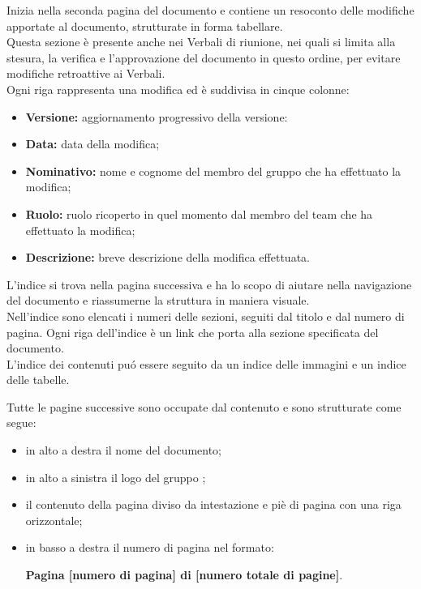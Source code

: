         Inizia nella seconda pagina del documento e contiene un resoconto delle modifiche apportate al documento, strutturate in forma tabellare.\\
        Questa sezione è presente anche nei Verbali di riunione, nei quali si limita alla stesura, la verifica e l'approvazione del documento in questo ordine, per evitare modifiche retroattive ai Verbali.\\
        Ogni riga rappresenta una modifica ed è suddivisa in cinque colonne:
        \begin{itemize}
          \item \textbf{Versione:} aggiornamento progressivo della versione:
          \item \textbf{Data:} data della modifica;
          \item \textbf{Nominativo:} nome e cognome del membro del gruppo che ha effettuato la modifica;
          \item \textbf{Ruolo:} ruolo ricoperto in quel momento dal membro del team che ha effettuato la modifica;
          \item \textbf{Descrizione:} breve descrizione della modifica effettuata.
        \end{itemize}

        L'indice si trova nella pagina successiva e ha lo scopo di aiutare nella navigazione del documento e riassumerne la struttura in maniera visuale.\\
        Nell'indice sono elencati i numeri delle sezioni, seguiti dal titolo e dal numero di pagina. Ogni riga dell'indice è un link che porta alla sezione specificata del documento.\\
        L'indice dei contenuti puó essere seguito da un indice delle immagini e un indice delle tabelle.

        Tutte le pagine successive sono occupate dal contenuto e sono strutturate come segue:
        \begin{itemize}
          \item in alto a destra il nome del documento;
          \item in alto a sinistra il logo del gruppo \Gruppo{};
          \item il contenuto della pagina diviso da intestazione e piè di pagina con una riga orizzontale;
          \item in basso a destra il numero di pagina nel formato:
          \begin{center}
            \textbf{Pagina [numero di pagina] di [numero totale di pagine]}.
          \end{center}
        \end{itemize}

